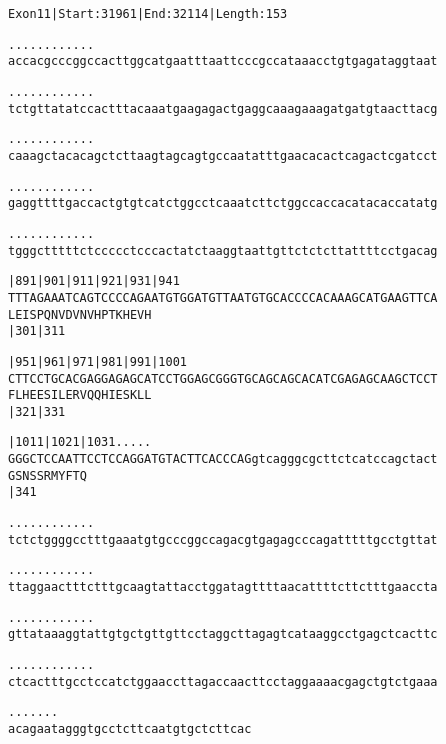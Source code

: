 \documentclass{article}
\begin{document}
\begin{alltt}
Exon 11 | Start: 31961 | End: 32114 | Length: 153

.    .    .    .    .    .    .    .    .    .    .    .    
accacgcccggccacttggcatgaatttaattcccgccataaacctgtgagataggtaat

.    .    .    .    .    .    .    .    .    .    .    .    
tctgttatatccactttacaaatgaagagactgaggcaaagaaagatgatgtaacttacg

.    .    .    .    .    .    .    .    .    .    .    .    
caaagctacacagctcttaagtagcagtgccaatatttgaacacactcagactcgatcct

.    .    .    .    .    .    .    .    .    .    .    .    
gaggttttgaccactgtgtcatctggcctcaaatcttctggccaccacatacaccatatg

.    .    .    .    .    .    .    .    .    .    .    .    
tgggctttttctccccctcccactatctaaggtaattgttctctcttattttcctgacag

      |891      |901      |911      |921      |931      |941
TTTAGAAATCAGTCCCCAGAATGTGGATGTTAATGTGCACCCCACAAAGCATGAAGTTCA
 L  E  I  S  P  Q  N  V  D  V  N  V  H  P  T  K  H  E  V  H 
                |301                          |311          

      |951      |961      |971      |981      |991      |1001
CTTCCTGCACGAGGAGAGCATCCTGGAGCGGGTGCAGCAGCACATCGAGAGCAAGCTCCT
 F  L  H  E  E  S  I  L  E  R  V  Q  Q  H  I  E  S  K  L  L 
                |321                          |331          

      |1011     |1021     |1031       .    .    .    .    . 
GGGCTCCAATTCCTCCAGGATGTACTTCACCCAGgtcagggcgcttctcatccagctact
 G  S  N  S  S  R  M  Y  F  T  Q                            
                |341                                        

   .    .    .    .    .    .    .    .    .    .    .    . 
tctctggggcctttgaaatgtgcccggccagacgtgagagcccagatttttgcctgttat

   .    .    .    .    .    .    .    .    .    .    .    . 
ttaggaactttctttgcaagtattacctggatagttttaacattttcttctttgaaccta

   .    .    .    .    .    .    .    .    .    .    .    . 
gttataaaggtattgtgctgttgttcctaggcttagagtcataaggcctgagctcacttc

   .    .    .    .    .    .    .    .    .    .    .    . 
ctcactttgcctccatctggaaccttagaccaacttcctaggaaaacgagctgtctgaaa

\end{alltt}
\newpage
\begin{alltt}
   .    .    .    .    .    .    .
acagaatagggtgcctcttcaatgtgctcttcac
\end{alltt}
\end{document}
